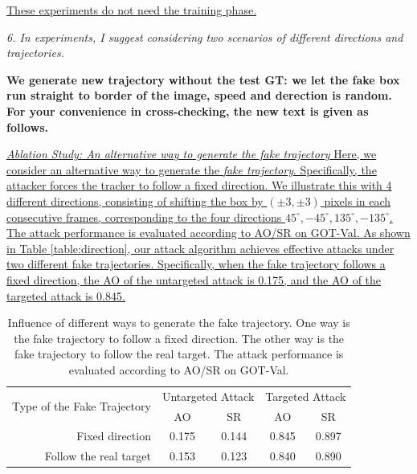 \documentclass[12pt]{article}
\begin{document}
\uline{These experiments do not need the training phase.}

\textit{6. In experiments, I suggest considering two scenarios of different directions and trajectories.}

\textbf{We generate new trajectory without the test GT: we let the fake box run straight to border of the image, speed and derection is random. For your convenience in cross-checking, the new text is given as follows.}

\uline{\textit{Ablation Study: An alternative way to generate the fake trajectory} Here, we consider an alternative way to generate the \textit{fake trajectory}. Specifically, the attacker forces the tracker to follow a fixed direction. We illustrate this with 4 different directions, consisting of shifting the box by $(\pm 3, \pm 3)$ pixels in each consecutive frames, corresponding to the four directions $45^{\circ}, -45^{\circ}, 135^{\circ}, -135^{\circ}$.
The attack performance is evaluated according to AO/SR on GOT-Val.
As shown in Table \ref{table:direction}, our attack algorithm achieves effective attacks under two different fake trajectories. Specifically, when the fake trajectory follows a fixed direction, the AO of the untargeted attack is 0.175, and the AO of the targeted attack is 0.845.}

\begin{table}[t]
  \renewcommand\thetable{\ref{table:direction}}
  \centering
  \caption{Influence of different ways to generate the fake trajectory. One way is the fake trajectory to follow a fixed direction. The other way is the fake trajectory to follow the real target. The attack performance is evaluated according to AO/SR on GOT-Val.}
  \begin{tabular}{@{}rcccc@{}}
  \toprule
  \multirow{2}{*}[-2pt]{Type of the Fake Trajectory} & \multicolumn{2}{c}{Untargeted Attack} & \multicolumn{2}{c}{Targeted Attack} \\ \cmidrule{2-5}
                              & AO                & SR                & AO               & SR               \\ \midrule
  Fixed direction             & 0.175             & 0.144             & 0.845            & 0.897            \\
  Follow the real target      & 0.153             & 0.123             & 0.840            & 0.890            \\ \bottomrule        
  \end{tabular}
\end{table}
\end{document}
